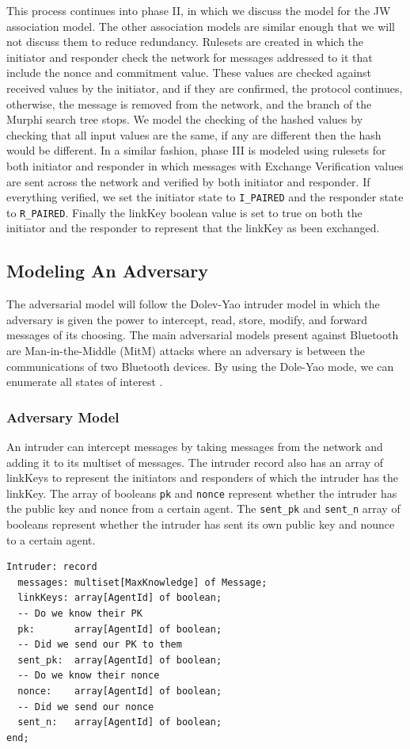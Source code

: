 \documentclass{acm_proc_article-sp}
\begin{document}
This process continues into phase II, in which we discuss the model for the JW association model. The other association models are similar enough that we will not discuss them to reduce redundancy. Rulesets are created in which the initiator and responder check the network for messages addressed to it that include the nonce and commitment value. These values are checked against received values by the initiator, and if they are confirmed, the protocol continues, otherwise, the message is removed from the network, and the branch of the Murphi search tree stops. We model the checking of the hashed values by checking that all input values are the same, if any are different then the hash would be different. In a similar fashion, phase III is modeled using rulesets for both initiator and responder in which messages with Exchange Verification values are sent across the network and verified by both initiator and responder. If everything verified, we set the initiator state to \texttt{I\_PAIRED} and the responder state to \texttt{R\_PAIRED}. Finally the linkKey boolean value is set to true on both the initiator and the responder to represent that the linkKey as been exchanged.

\subsection{Modeling An Adversary}
The adversarial model will follow the Dolev-Yao intruder model \cite{dolev:yao} in which the adversary is given the power to intercept, read, store, modify, and forward messages of its choosing. The main adversarial models present against Bluetooth are Man-in-the-Middle (MitM) attacks where an adversary is between the communications of two Bluetooth devices. By using the Dole-Yao mode, we can enumerate all states of interest \cite{dolev:yao}.

\subsubsection{Adversary Model}
An intruder can intercept messages by taking messages from the network and adding it to its multiset of messages. The intruder record also has an array of linkKeys to represent the initiators and responders of which the intruder has the linkKey. The array of booleans \texttt{pk} and \texttt{nonce} represent whether the intruder has the public key and nonce from a certain agent. The \texttt{sent\_pk} and \texttt{sent\_n} array of booleans represent whether the intruder has sent its own public key and nounce to a certain agent.
\begin{verbatim}
Intruder: record 
  messages: multiset[MaxKnowledge] of Message;
  linkKeys: array[AgentId] of boolean;
  -- Do we know their PK
  pk:       array[AgentId] of boolean;
  -- Did we send our PK to them
  sent_pk:  array[AgentId] of boolean;
  -- Do we know their nonce
  nonce:    array[AgentId] of boolean;
  -- Did we send our nonce
  sent_n:   array[AgentId] of boolean;
end;
\end{verbatim}
\end{document}
